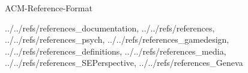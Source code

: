 \documentclass[11pt, titlepage]{article}
\begin{document}
    \clearpage

    

    \clearpage

    

    \clearpage

    

    \clearpage

    

    \clearpage

    

    \clearpage

    

    \clearpage

     {ACM-Reference-Format}
    
    {../../refs/references_documentation, ../../refs/references,
    ../../refs/references_psych, ../../refs/references_gamedesign,
    ../../refs/references_definitions, ../../refs/references_media,
    ../../refs/references_SEPerspective, ../../refs/references_Geneva}

    \clearpage

    \begin{appendix}

        

        \clearpage

        

    \end{appendix}
\end{document}
